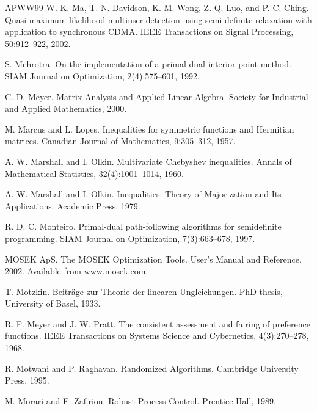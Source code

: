 \begin{thebibliography}{APWW99}
 W.-K. Ma, T. N. Davidson, K. M. Wong, Z.-Q. Luo, and P.-C. Ching. Quasi-maximum-likelihood multiuser detection using semi-definite relaxation with application to synchronous CDMA. IEEE Transactions on Signal Processing, 50:912–922, 2002.

 S. Mehrotra. On the implementation of a primal-dual interior point method. SIAM Journal on Optimization, 2(4):575–601, 1992.

 C. D. Meyer. Matrix Analysis and Applied Linear Algebra. Society for Industrial and Applied Mathematics, 2000.

 M. Marcus and L. Lopes. Inequalities for symmetric functions and Hermitian matrices. Canadian Journal of Mathematics, 9:305–312, 1957.

 A. W. Marshall and I. Olkin. Multivariate Chebyshev inequalities. Annals of Mathematical Statistics, 32(4):1001–1014, 1960.

 A. W. Marshall and I. Olkin. Inequalities: Theory of Majorization and Its Applications. Academic Press, 1979.

 R. D. C. Monteiro. Primal-dual path-following algorithms for semidefinite programming. SIAM Journal on Optimization, 7(3):663–678, 1997.

 MOSEK ApS. The MOSEK Optimization Tools. User’s Manual and Reference, 2002. Available from www.mosek.com.

 T. Motzkin. Beiträge zur Theorie der linearen Ungleichungen. PhD thesis, University of Basel, 1933.

 R. F. Meyer and J. W. Pratt. The consistent assessment and fairing of preference functions. IEEE Transactions on Systems Science and Cybernetics, 4(3):270–278, 1968.

 R. Motwani and P. Raghavan. Randomized Algorithms. Cambridge University Press, 1995.

 M. Morari and E. Zafiriou. Robust Process Control. Prentice-Hall, 1989.


\end{thebibliography}
